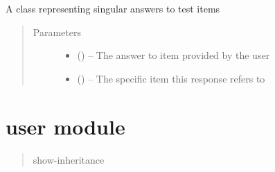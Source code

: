 \documentclass[letterpaper,10pt,english]{sphinxmanual}
\begin{document}
\begin{fulllineitems}
\label{\detokenize{test_item_response:test_item_response.TestItemResponse}}
A class representing singular answers to test items
\begin{quote}\begin{description}
\item[{Parameters}] \leavevmode\begin{itemize}
\item {} 
 () -- The answer to item provided by the user

\item {} 
 ({\hyperref[\detokenize{test_item:test_item.TestItem}]{}}) -- The specific item this response refers to

\end{itemize}

\end{description}\end{quote}

\end{fulllineitems}



\chapter{user module}
\label{\detokenize{user:module-user}}\label{\detokenize{user::doc}}\label{\detokenize{user:user-module}}\begin{quote}\begin{description}
\item[{show-inheritance}] \leavevmode
\end{description}\end{quote}
\end{document}
